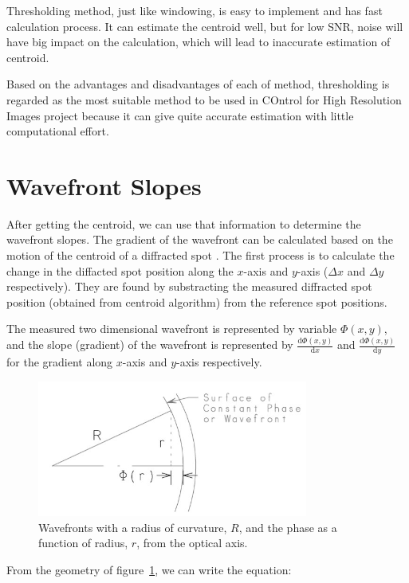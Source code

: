\documentclass{article}
\begin{document}
Thresholding method, just like windowing, is easy to implement and has fast calculation process. It can estimate the centroid well, but for low SNR, noise will have big impact on the calculation, which will lead to inaccurate estimation of centroid.

Based on the advantages and disadvantages of each of method, thresholding is regarded as the most suitable method to be used in COntrol for High Resolution Images project because it can give quite accurate estimation with little computational effort.

\section{Wavefront Slopes}

After getting the centroid, we can use that information to determine the wavefront slopes. The gradient of the wavefront can be calculated based on the motion of the centroid of a diffracted spot \cite{spiricon04}. The first process is to calculate the change in the diffacted spot position along the $x$-axis and $y$-axis ($\Delta x$ and $\Delta y$ respectively). They are found by substracting the measured diffracted spot position (obtained from centroid algorithm) from the reference spot positions.

The measured two dimensional wavefront is represented by variable $\Phi(x,y)$, and the slope (gradient) of the wavefront is represented by $\frac{\mathrm{d} \Phi(x,y)}{\mathrm{d} x}$ and $\frac{\mathrm{d} \Phi(x,y)}{\mathrm{d} y}$ for the gradient along $x$-axis and $y$-axis respectively.

\begin{figure}[H]
    \centering
    \includegraphics[width=3.5in]{figures/slope1.jpg}
    \caption{Wavefronts with a radius of curvature, $R$, and the phase as a function of radius, $r$, from the optical axis.}
    \label{fig:slope1}
\end{figure}

From the geometry of figure~\ref{fig:slope1}, we can write the equation:
\end{document}
